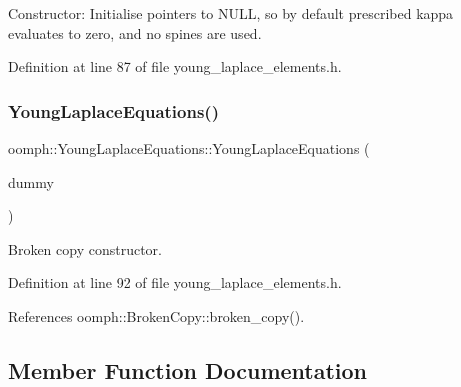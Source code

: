 Constructor\+: Initialise pointers to N\+U\+LL, so by default prescribed kappa evaluates to zero, and no spines are used. 

Definition at line 87 of file young\+\_\+laplace\+\_\+elements.\+h.

\mbox{\label{classoomph_1_1YoungLaplaceEquations_a5002b4fe54384d6a393c8af4b8dc8a4c}} 
\subsubsection{\texorpdfstring{Young\+Laplace\+Equations()}{YoungLaplaceEquations()}\hspace{0.1cm}{\footnotesize\ttfamily [2/2]}}
{\footnotesize\ttfamily oomph\+::\+Young\+Laplace\+Equations\+::\+Young\+Laplace\+Equations (\begin{DoxyParamCaption}\item[{const \hyperlink{classoomph_1_1YoungLaplaceEquations}{Young\+Laplace\+Equations} \&}]{dummy }\end{DoxyParamCaption})\hspace{0.3cm}{\ttfamily [inline]}}



Broken copy constructor. 



Definition at line 92 of file young\+\_\+laplace\+\_\+elements.\+h.



References oomph\+::\+Broken\+Copy\+::broken\+\_\+copy().



\subsection{Member Function Documentation}
\mbox{\label{classoomph_1_1YoungLaplaceEquations_a3a618a00109c733bc38eee0623386d2b}} 
